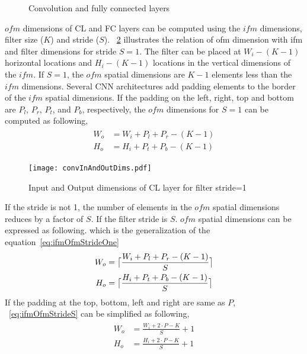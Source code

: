 \begin{figure}[!htb]
	\centering
	\captionsetup{font=sf}	
	\hfil	
	\hfil	
	\caption{Convolution and fully connected layers}
	\label{fig:CNNAcceleratorAndCLOps}
\end{figure}

$ofm$ dimensions of CL and FC layers can be computed using the $ifm$ dimensions, filter size ($K$) and stride ($S$). \figurename{~\ref{fig:CLInOutDimRel}} illustrates the relation of ofm dimension with ifm and filter dimensions for stride $S{=}1$. The filter can be placed at $W_i{-}(K{-}1)$ horizontal locations and $H_i{-}(K{-}1)$ locations in the vertical dimensions of the $ifm$. If $S{=}1$, the $ofm$ spatial dimensions are $K{-}1$ elements less than the $ifm$ dimensions. Several CNN architectures add padding elements to the border of the $ifm$ spatial dimensions. If the padding on the left, right, top and bottom are $P_l$, $P_r$, $P_t$, and $P_b$, respectively, the $ofm$ dimensions for $S{=}1$ can be computed as following,
\begin{align}\label{eq:ifmOfmStrideOne}
	\begin{split}
W_o&=W_i+P_l+P_r-(K-1)\\
H_o&=H_i+P_t+P_b-(K-1)
\end{split}
\end{align}
\begin{figure}[!htb]
	\centering
	\captionsetup{font=sf}	
	{\texttt{[image: convInAndOutDims.pdf]}
		\label{fig:CLInOutRelHz}}
	\caption{Input and Output dimensions of CL layer for filter stride=1  }
	\label{fig:CLInOutDimRel}
\end{figure}
If the stride is not 1, the number of elements in the $ofm$ spatial dimensions reduces by a factor of $S$. If the filter stride is $S$. $ofm$ spatial dimensions can be expressed as following. which is the generalization of the equation~\eqref{eq:ifmOfmStrideOne}
\begin{align}\label{eq:ifmOfmStrideS}
	\begin{split}
		W_o&=\ceil[\big]{\frac{W_i+P_l+P_r-(K-1)}{S}}\\
		H_o&=\ceil[\big]{\frac{H_i+P_t+P_b-(K-1)}{S}}
	\end{split}
\end{align}
If the padding at the top, bottom, left and right are same as $P$, ~\eqref{eq:ifmOfmStrideS} can be simplified as following,
\begin{align}\label{eq:ifmOfmStrideS_P}
	\begin{split}
		W_o&={\frac{W_i+2\cdot P-K}{S}}{+}1\\
		H_o&={\frac{H_i+2\cdot P-K}{S}{+}1}
	\end{split}
\end{align}

